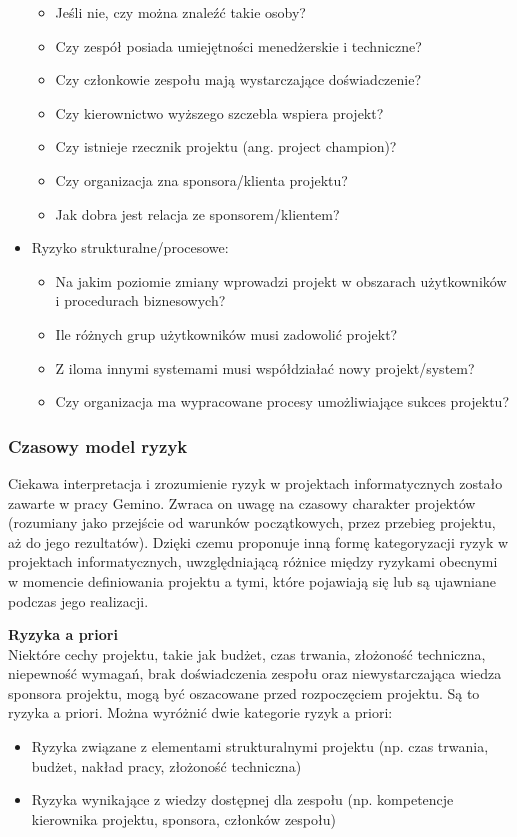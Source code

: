 \begin{itemize}
\begin{itemize}
        \item Jeśli nie, czy można znaleźć takie osoby?
        \item Czy zespół posiada umiejętności menedżerskie i techniczne?
        \item Czy członkowie zespołu mają wystarczające doświadczenie?
        \item Czy kierownictwo wyższego szczebla wspiera projekt?
        \item Czy istnieje rzecznik projektu (ang. project champion)?
        \item Czy organizacja zna sponsora/klienta projektu?
        \item Jak dobra jest relacja ze sponsorem/klientem?
    \end{itemize}
    \item Ryzyko strukturalne/procesowe:
    \begin{itemize}
        \item Na jakim poziomie zmiany wprowadzi projekt w obszarach użytkowników i procedurach biznesowych?
        \item Ile różnych grup użytkowników musi zadowolić projekt?
        \item Z iloma innymi systemami musi współdziałać nowy projekt/system?
        \item Czy organizacja ma wypracowane procesy umożliwiające sukces projektu?
    \end{itemize}
\end{itemize}

\subsubsection{Czasowy model ryzyk}
Ciekawa interpretacja i zrozumienie ryzyk w projektach informatycznych zostało zawarte w pracy Gemino. \autocite{ryzyka} Zwraca on uwagę na czasowy charakter projektów (rozumiany jako przejście od warunków początkowych, przez przebieg projektu, aż do jego rezultatów). Dzięki czemu proponuje inną formę kategoryzacji ryzyk w projektach informatycznych, uwzględniającą różnice między ryzykami obecnymi w momencie definiowania projektu a tymi, które pojawiają się lub są ujawniane podczas jego realizacji.

\textbf{Ryzyka a priori}\\
Niektóre cechy projektu, takie jak budżet, czas trwania, złożoność techniczna, niepewność wymagań, brak doświadczenia zespołu oraz niewystarczająca wiedza sponsora projektu, mogą być oszacowane przed rozpoczęciem projektu. Są to ryzyka a priori. Można wyróżnić dwie kategorie ryzyk a priori:
\begin{itemize}
    \item Ryzyka związane z elementami strukturalnymi projektu (np. czas trwania, budżet, nakład pracy, złożoność techniczna)
    \item Ryzyka wynikające z wiedzy dostępnej dla zespołu (np. kompetencje kierownika projektu, sponsora, członków zespołu)
\end{itemize}

